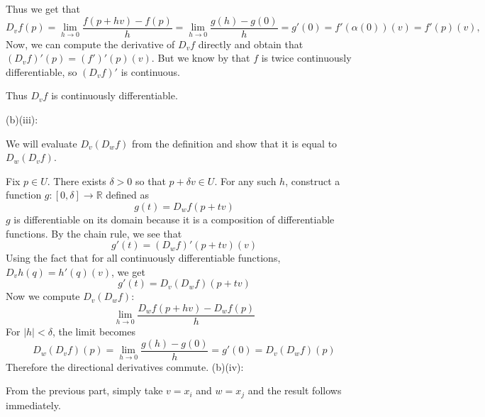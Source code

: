 \documentclass{article}
\theoremstyle{plain} %
\numberwithin{thm}{section} %
\theoremstyle{definition}
\begin{document}
\begin{question}{28}
        Thus we get that
        \[
            D_v f(p) = \lim_{h \to 0} \frac{f(p + hv) - f(p)}{h} = \lim_{h \to 0} \frac{g(h) - g(0)}{h} = g'(0) = f'(\alpha (0))(v) = f'(p)(v),
        \]
        Now, we can compute the derivative of \(D_{v} f\) directly and obtain that \((D_v f)'(p) = (f')'(p)(v)\). But we know by that \(f\) is twice continuously differentiable, so \((D_v f)'\) is continuous.

        Thus \(D_v f\) is continuously differentiable.
        \medskip

        (b)(iii):

        We will evaluate \(D_v (D_w f)\) from the definition and show that it is equal to \(D_w (D_v f)\).

        Fix \(p \in U\). There exists \(\delta > 0\) so that \(p + \delta v \in U\). For any such \(h\), construct a function \(g : [0,\delta] \to \mathbb{R}\) defined as
        \[
            g(t) = D_w f(p + tv)
        \]
        \(g\) is differentiable on its domain because it is a composition of differentiable functions. By the chain rule, we see that
        \[
            g'(t) = (D_w f)'(p+tv)(v)
        \]
        Using the fact that for all continuously differentiable functions, \(D_v h (q) = h'(q)(v)\), we get
        \[
            g'(t) = D_v (D_w f) (p+tv)
        \]
        Now we compute \(D_v (D_w f)\):
        \[
            \lim_{h \to 0} \frac{D_w f(p+hv) - D_w f(p)}{h}
        \]
        For \(|h| < \delta\), the limit becomes
        \[
            D_w (D_v f) (p) = \lim_{h \to 0} \frac{g(h) - g(0)}{h} = g'(0) = D_v (D_w f) (p)
        \]
        Therefore the directional derivatives commute.
        \medbreak
        (b)(iv):

        From the previous part, simply take \(v = x_i\) and \(w = x_j\) and the result follows immediately.
    \end{question}
    \newpage
\end{document}
